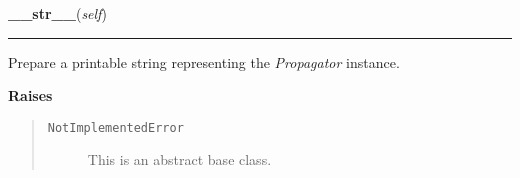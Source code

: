     \label{Propagator:Propagator:__str__}

    \vspace{0.5ex}

\hspace{.8\funcindent}\begin{boxedminipage}{\funcwidth}

    \raggedright \textbf{\_\_str\_\_}(\textit{self})

    \vspace{-1.5ex}

    \rule{\textwidth}{0.5\fboxrule}
\setlength{\parskip}{2ex}
    Prepare a printable string representing the \textit{Propagator}
    instance.

\setlength{\parskip}{1ex}
      \textbf{Raises}
    \vspace{-1ex}

      \begin{quote}
        \begin{description}

          \item[\texttt{NotImplementedError}]

          This is an abstract base class.

        \end{description}

      \end{quote}

    \end{boxedminipage}

    \label{Propagator:Propagator:get_number_components}

    \vspace{0.5ex}

